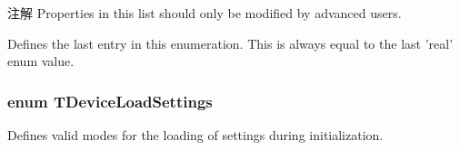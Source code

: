 \begin{Desc}
\begin{description}
\begin{DoxyNote}{注解}
Properties in this list should only be modified by advanced users. 
\end{DoxyNote}
\item[{\em 
\hypertarget{group___common_interface_gga0dca79bbf0803a4ecec16d6cbb1a3dbbadb05974e1aac0d8c3b63eeaba1fc9fe3}{dlt\+Last}\label{group___common_interface_gga0dca79bbf0803a4ecec16d6cbb1a3dbbadb05974e1aac0d8c3b63eeaba1fc9fe3}
}]Defines the last entry in this enumeration. This is always equal to the last 'real' enum value. \end{description}
\end{Desc}
\hypertarget{group___common_interface_gae5dacc6187e94639fe9153711917d6e3}{
\subsubsection[{T\+Device\+Load\+Settings}]{\setlength{\rightskip}{0pt plus 5cm}enum {\bf T\+Device\+Load\+Settings}}}\label{group___common_interface_gae5dacc6187e94639fe9153711917d6e3}


Defines valid modes for the loading of settings during initialization. 

